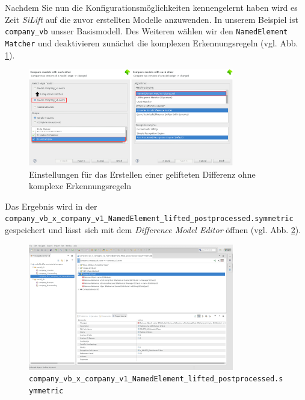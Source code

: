 \documentclass[a4paper]{scrartcl}
\begin{document}
Nachdem Sie nun die Konfigurationsmöglichkeiten kennengelernt haben wird es Zeit \textit{SiLift} auf die zuvor erstellten Modelle anzuwenden.
In unserem Beispiel ist \texttt{company\_vb} unsser Basismodell. Des Weiteren wählen wir den \texttt{NamedElement Matcher} und deaktivieren zunächst die komplexen Erkennungsregeln (vgl. Abb. \ref{silift-tutorial_compare_config}).

\begin{figure}[H]
\centering
\includegraphics[width=0.8\textwidth]{graphics/silift-tutorial_compare_config.png}
\caption{Einstellungen für das Erstellen einer gelifteten Differenz ohne komplexe Erkennungsregeln}
\label{silift-tutorial_compare_config}
\end{figure}

Das Ergebnis wird in der \texttt{company\_vb\_x\_company\_v1\_NamedElement\_lifted\_post\-pro\-cessed.symmetric} gespeichert und lässt sich mit dem \textit{Difference Model Editor} öffnen (vgl. Abb. \ref{silift-tutorial_compare_atomic_lifted}).

\begin{figure}[H]
\centering
\includegraphics[width=0.8\textwidth]{graphics/silift-tutorial_compare_atomic_lifted.png}
\caption{\texttt{company\_vb\_x\_company\_v1\_NamedElement\_lifted\_post\-pro\-cessed.symmetric}}
\label{silift-tutorial_compare_atomic_lifted}
\end{figure}
\end{document}
